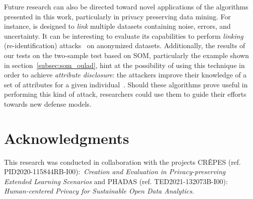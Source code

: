 Future research can also be directed toward novel applications of the algorithms presented in this work,
particularly in privacy preserving data mining.
For instance, \PresQ is designed to \emph{link} multiple datasets containing noise, errors, and uncertainty.
It can be interesting to evaluate its capabilities to perform \emph{linking} (re-identification)
attacks~\cite{Chen2009} on anonymized datasets. Additionally, the results of our tests on the
two-sample test based on \gls{SOM}, particularly the example shown in section~\ref{subsec:som_oulad},
 hint at the possibility of using this technique in order to achieve \emph{attribute disclosure}:
 the attackers improve their knowledge of a set of attributes for a given individual~\cite{ENISA2015}.
Should these algorithms prove useful in performing this kind of attack, researchers could
use them to guide their efforts towards new defense models.


\section*{Acknowledgments}

This research was conducted in collaboration with the projects
CR\^EPES (ref. PID2020-115844RB-I00): \textit{Creation and Evaluation in Privacy-preserving Extended Learning Scenarios}
and PHADAS (ref. TED2021-132073B-I00): \textit{Human-centered Privacy for Sustainable Open Data Analytics}.
